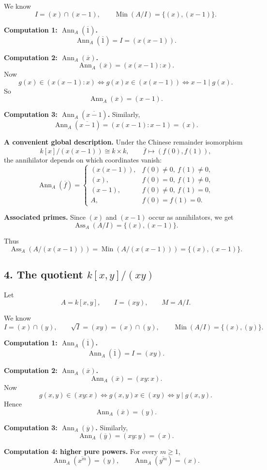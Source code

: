 \documentclass[12pt,a4paper]{article}
\theoremstyle{notespace}
\DeclareMathOperator{\Ass}{Ass}
\DeclareMathOperator{\Ann}{Ann}
\DeclareMathOperator{\Min}{Min}
\begin{document}
We know
\[
I=(x)\cap(x-1),
\qquad
\Min(A/I)=\{(x),(x-1)\}.
\]

\textbf{Computation 1: \(\Ann_A(\overline 1)\).}
\[
\Ann_A(\overline 1)=I=(x(x-1)).
\]

\textbf{Computation 2: \(\Ann_A(\overline x)\).}
\[
\Ann_A(\overline x)=(x(x-1):x).
\]
Now
\[
g(x)\in (x(x-1):x)
\iff g(x)x\in (x(x-1))
\iff x-1\mid g(x).
\]
So
\[
\Ann_A(\overline x)=(x-1).
\]

\textbf{Computation 3: \(\Ann_A(\overline{x-1})\).}
Similarly,
\[
\Ann_A(\overline{x-1})=(x(x-1):x-1)=(x).
\]

\textbf{A convenient global description.}
Under the Chinese remainder isomorphism
\[
k[x]/(x(x-1))\cong k\times k,
\qquad
\overline f\longmapsto (f(0),f(1)),
\]
the annihilator depends on which coordinates vanish:
\[
\Ann_A(\overline f)=
\begin{cases}
	(x(x-1)), & f(0)\neq 0,\ f(1)\neq 0,\\[1mm]
	(x), & f(0)=0,\ f(1)\neq 0,\\[1mm]
	(x-1), & f(0)\neq 0,\ f(1)=0,\\[1mm]
	A, & f(0)=f(1)=0.
\end{cases}
\]

\textbf{Associated primes.}
Since \((x)\) and \((x-1)\) occur as annihilators, we get
\[
\Ass_A(A/I)=\{(x),(x-1)\}.
\]

Thus
\[
\Ass_A(A/(x(x-1)))=\Min(A/(x(x-1)))=\{(x),(x-1)\}.
\]

\subsection*{4. The quotient \(k[x,y]/(xy)\)}

Let
\[
A=k[x,y],\qquad I=(xy),\qquad M=A/I.
\]

We know
\[
I=(x)\cap(y),
\qquad
\sqrt I=(xy)=(x)\cap(y),
\qquad
\Min(A/I)=\{(x),(y)\}.
\]

\textbf{Computation 1: \(\Ann_A(\overline 1)\).}
\[
\Ann_A(\overline 1)=I=(xy).
\]

\textbf{Computation 2: \(\Ann_A(\overline x)\).}
\[
\Ann_A(\overline x)=(xy:x).
\]
Now
\[
g(x,y)\in (xy:x)
\iff g(x,y)x\in (xy)
\iff y\mid g(x,y).
\]
Hence
\[
\Ann_A(\overline x)=(y).
\]

\textbf{Computation 3: \(\Ann_A(\overline y)\).}
Similarly,
\[
\Ann_A(\overline y)=(xy:y)=(x).
\]

\textbf{Computation 4: higher pure powers.}
For every \(m\ge 1\),
\[
\Ann_A(\overline{x^m})=(y),
\qquad
\Ann_A(\overline{y^m})=(x).
\]
\end{document}
